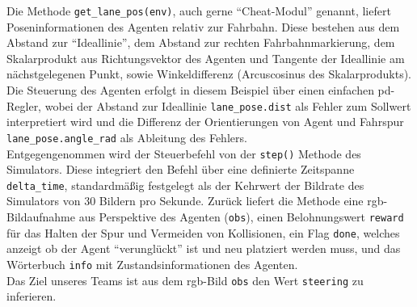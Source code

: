 Die Methode \texttt{get\_lane\_pos(env)}, auch gerne ``Cheat-Modul'' genannt, liefert Poseninformationen des Agenten relativ zur Fahrbahn. Diese bestehen aus dem Abstand zur ``Ideallinie'', dem Abstand zur rechten Fahrbahnmarkierung, dem Skalarprodukt aus Richtungsvektor des Agenten und Tangente der Ideallinie am nächstgelegenen Punkt, sowie Winkeldifferenz (Arcuscosinus des Skalarprodukts).\\

Die Steuerung des Agenten erfolgt in diesem Beispiel über einen einfachen \acs{pd}-Regler, wobei der Abstand zur Ideallinie \texttt{lane\_pose.dist} als Fehler zum Sollwert interpretiert wird und die Differenz der Orientierungen von Agent und Fahrspur \texttt{lane\_pose.angle\_rad} als Ableitung des Fehlers.\\

Entgegengenommen wird der Steuerbefehl von der \texttt{step()} Methode des Simulators. Diese integriert den Befehl über eine definierte Zeitspanne \texttt{delta\_time}, standardmäßig festgelegt als der Kehrwert der Bildrate des Simulators von 30 Bildern pro Sekunde. Zurück liefert die Methode eine \acs{rgb}-Bildaufnahme aus Perspektive des Agenten (\texttt{obs}), einen Belohnungswert \texttt{reward} für das Halten der Spur und Vermeiden von Kollisionen, ein Flag \texttt{done}, welches anzeigt ob der Agent ``verunglückt'' ist und neu platziert werden muss, und das Wörterbuch \texttt{info} mit Zustandsinformationen des Agenten.\\

Das Ziel unseres Teams ist aus dem \acs{rgb}-Bild \texttt{obs} den Wert \texttt{steering} zu inferieren.